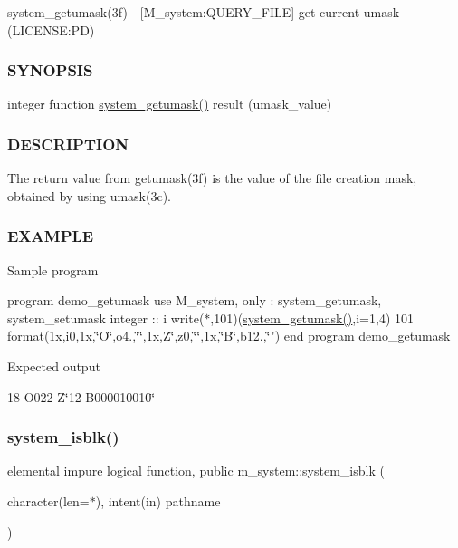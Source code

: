system\+\_\+getumask(3f) -\/ \mbox{[}M\+\_\+system\+:Q\+U\+E\+R\+Y\+\_\+\+F\+I\+LE\mbox{]} get current umask (L\+I\+C\+E\+N\+SE\+:PD) \subsubsection*{S\+Y\+N\+O\+P\+S\+IS}

integer function \mbox{\hyperlink{namespacem__system_aa9ca951be39d2ea738d627cf42c00ddd}{system\+\_\+getumask()}} result (umask\+\_\+value) \subsubsection*{D\+E\+S\+C\+R\+I\+P\+T\+I\+ON}

The return value from getumask(3f) is the value of the file creation mask, obtained by using umask(3c). \subsubsection*{E\+X\+A\+M\+P\+LE}

Sample program

program demo\+\_\+getumask use M\+\_\+system, only \+: system\+\_\+getumask, system\+\_\+setumask integer \+:\+: i write($\ast$,101)(\mbox{\hyperlink{namespacem__system_aa9ca951be39d2ea738d627cf42c00ddd}{system\+\_\+getumask()}},i=1,4) 101 format(1x,i0,1x,\char`\"{}\+O\textquotesingle{}\char`\"{},o4.,\char`\"{}\textquotesingle{}\char`\"{},1x,\textquotesingle{}Z\char`\"{}\textquotesingle{},z0,\char`\"{}\textquotesingle{}\char`\"{},1x,\char`\"{}B\textquotesingle{}\char`\"{},b12.,\char`\"{}\textquotesingle{}") end program demo\+\_\+getumask

Expected output

18 O\textquotesingle{}022\textquotesingle{} Z\char`\"{}12\textquotesingle{} B\textquotesingle{}000010010\char`\"{} \mbox{\label{namespacem__system_a1294b8d8b4910261c0a0991bf668ab67}} 
\subsubsection{\texorpdfstring{system\+\_\+isblk()}{system\_isblk()}}
{\footnotesize\ttfamily elemental impure logical function, public m\+\_\+system\+::system\+\_\+isblk (\begin{DoxyParamCaption}\item[{character(len=$\ast$), intent(in)}]{pathname }\end{DoxyParamCaption})}




